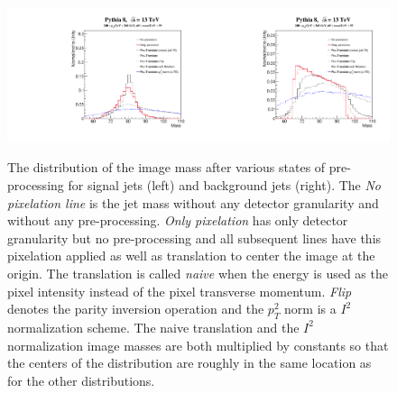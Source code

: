 \begin{figure}[htbp!]
  \begin{center}
        \includegraphics[width=0.5\textwidth]{figures/ImageMass_Comparison.pdf}\includegraphics[width=0.5\textwidth]{figures/ImageMass_Comparison_back.pdf}
      \caption{ The distribution of the image mass after various states of pre-processing for signal jets (left) and background jets (right).  The {\it No pixelation line} is the jet mass without any detector granularity and without any pre-processing.  {\it Only pixelation} has only detector granularity but no pre-processing and all subsequent lines have this pixelation applied as well as translation to center the image at the origin.  The translation is called {\it naive} when the energy is used as the pixel intensity instead of the pixel transverse momentum.  {\it Flip} denotes the parity inversion operation and the $p_T^2$ norm is a $I^2$ normalization scheme.  The naive translation and the $I^2$ normalization image masses are both multiplied by constants so that the centers of the distribution are roughly in the same location as for the other distributions.
      \label{fig:preprocess2} }
    \end{center}
\end{figure}


